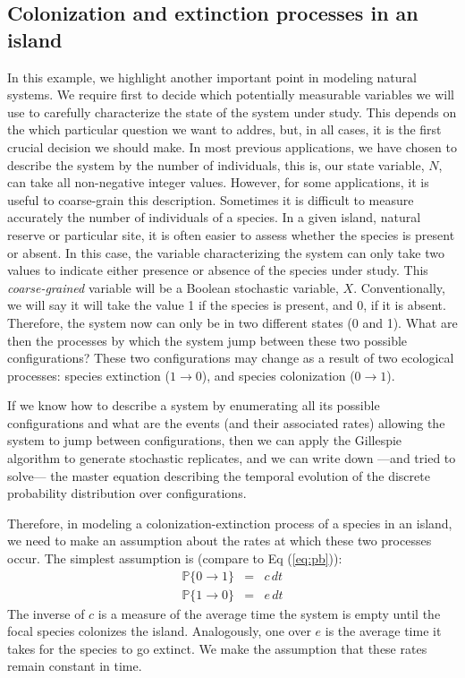 \documentclass{article}
\newcommand{\Pb}{{\mathbb P}}
\begin{document}
\subsection{Colonization and extinction processes in an island}
In this example, we highlight another important point in modeling natural systems. We require first to decide which potentially measurable variables we will use to carefully characterize the state of the system under study. This depends on the which particular question we want to addres, but, in all cases, it is the first crucial decision we should make. In most previous applications, we have chosen to describe the system by the number of individuals, this is, our state variable, $N$, can take all non-negative integer values. However, for some applications, it is useful to coarse-grain this description. Sometimes it is difficult to measure accurately the number of individuals of a species. In a given island, natural reserve or particular site, it is often easier to assess whether the species is present or absent. In this case, the variable characterizing the system can only take two values to indicate either presence or absence of the species under study. This {\it coarse-grained} variable will be a Boolean stochastic variable, $X$. Conventionally, we will say it will take the value 1 if the species is present, and 0, if it is absent. Therefore, the system now can only be in two different states (0 and 1). What are then the processes by which the system jump between these two possible configurations?  These two configurations may change as a result of two ecological processes: species extinction ($1 \rightarrow 0$), and species colonization ($0 \rightarrow 1$). 
\smallskip

If we know how to describe a system by enumerating all its possible configurations and what are the events (and their associated rates) allowing the system to jump between configurations, then we can apply the Gillespie algorithm to generate stochastic replicates, and we can write down ---and tried to solve--- the master equation describing the temporal evolution of the discrete probability distribution over configurations.
\smallskip

Therefore, in modeling a colonization-extinction process of a species in an island, we need to make an assumption about the rates at which these two processes occur. The simplest assumption is (compare to Eq (\ref{eq:pb})):
\begin{eqnarray}
\Pb\{ 0 \longrightarrow 1 \} & = & c\,dt \nonumber\\
\Pb\{ 1 \longrightarrow 0 \} & = & e\,dt
\label{eq:c-e}
\end{eqnarray}
The inverse of $c$ is a measure of the average time the system is empty until the focal species colonizes the island. Analogously, one over $e$ is the average time it takes for the species to go extinct. We make the assumption that these rates remain constant in time. 
\smallskip
\end{document}
